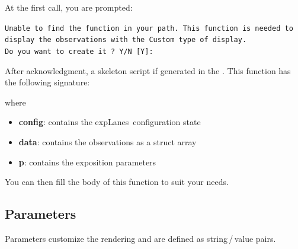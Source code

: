 \documentclass[a4paper,fleqn]{tufte-handout}
\newcommand{\explanes}{\textsf{expLanes}\ }
\begin{document}
At the first call, you are prompted:

\texttt{Unable to find the function  in your path. This function is needed to display the observations with the Custom type of display. \\
Do you want to create it ? Y/N [Y]:}

After acknowledgment, a skeleton script if generated in the . This function has the following signature:


\noindent where
\begin{itemize}
\item \textbf{config}: contains the \explanes configuration state
\item \textbf{data}: contains the observations as a struct array
\item \textbf{p}: contains the exposition parameters
\end{itemize}

You can then fill the body of this function to suit your needs.

\subsection{Parameters}

Parameters customize the rendering and are defined as string\,/\,value pairs.
\end{document}
